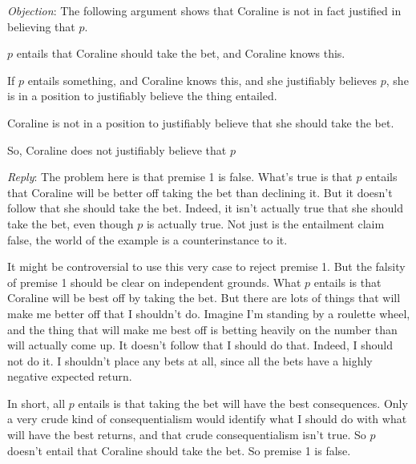 \documentclass[11pt,oneside]{book}
\newcommand{\objrep}[2]{
\bigskip
\noindent \textit{Objection}: #1

\medskip
\noindent \textit{Reply}: #2

}
\newcommand{\argconc}{
\renewcommand{\labelenumi}{\Alph{enumi}.}
\setcounter{enumi}{2}
}
\begin{document}
\objrep{
The following argument shows that Coraline is not in fact justified in believing that $p$.

\begin{enumerate*}
\item $p$ entails that Coraline should take the bet, and Coraline knows this.
\item If $p$ entails something, and Coraline knows this, and she justifiably believes $p$, she is in a position to justifiably believe the thing entailed.
\item Coraline is not in a position to justifiably believe that she should take the bet.
\argconc
\item So, Coraline does not justifiably believe that $p$
\end{enumerate*}}
{The problem here is that premise 1 is false. What's true is that $p$ entails that Coraline will be better off taking the bet than declining it. But it doesn't follow that she should take the bet. Indeed, it isn't actually true that she should take the bet, even though $p$ is actually true. Not just is the entailment claim false, the world of the example is a counterinstance to it.

It might be controversial to use this very case to reject premise 1. But the falsity of premise 1 should be clear on independent grounds. What $p$ entails is that Coraline will be best off by taking the bet. But there are lots of things that will make me better off that I shouldn't do.  Imagine I'm standing by a roulette wheel, and the thing that will make me best off is betting heavily on the number than will actually come up. It doesn't follow that I should do that. Indeed, I should not do it. I shouldn't place any bets at all, since all the bets have a highly negative expected return. 

In short, all $p$ entails is that taking the bet will have the best consequences. Only a very crude kind of consequentialism would identify what I should do with what will have the best returns, and that crude consequentialism isn't true. So $p$ doesn't entail that Coraline should take the bet. So premise 1 is false.}
\end{document}
